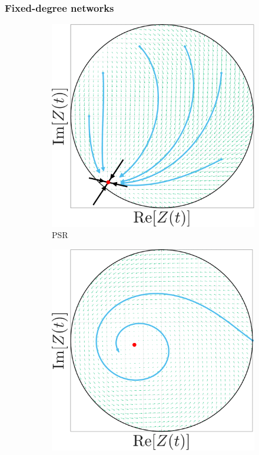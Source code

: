 \begin{frame}
\frametitle{Fixed-degree networks}
\begin{figure}[H]
\centering
\begin{subfigure}[b]{0.32\linewidth}
   \centering
  \includegraphics[width=\linewidth]{../Figures/PhaseSpace/MFRPSR.pdf}
  \caption{PSR}
   \label{fig:MFRPSR} 
\end{subfigure} \hfill
\begin{subfigure}[b]{0.32\linewidth}
   \centering
  \includegraphics[width=\linewidth]{../Figures/PhaseSpace/MFRPSS.pdf}

\end{subfigure}
\end{figure}
\end{frame}
